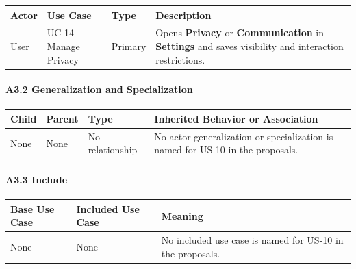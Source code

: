 \documentclass[12pt]{article}
\renewcommand{\baselinestretch}{1.5}
\begin{document}
\begingroup
\small
\renewcommand{\baselinestretch}{1.0}\selectfont
\renewcommand{\arraystretch}{1.15}
\setlength{\tabcolsep}{6pt}
\begin{longtable}{|>{\raggedright\arraybackslash}p{}|>{\raggedright\arraybackslash}p{}|>{\raggedright\arraybackslash}p{}|>{\raggedright\arraybackslash}p{}|}
\hline
\textbf{Actor} & \textbf{Use Case} & \textbf{Type} & \textbf{Description} \\ \hline
\endhead
User & UC-14 Manage Privacy & Primary & Opens \textbf{Privacy} or \textbf{Communication} in \textbf{Settings} and saves visibility and interaction restrictions. \\ \hline
\end{longtable}
\endgroup
\par\medskip

\hypertarget{sec:a3-2-generalization-and-specialization}{}
\paragraph*{A3.2 Generalization and Specialization}
\par\medskip

\begingroup
\small
\renewcommand{\baselinestretch}{1.0}\selectfont
\renewcommand{\arraystretch}{1.15}
\setlength{\tabcolsep}{6pt}
\begin{longtable}{|>{\raggedright\arraybackslash}p{}|>{\raggedright\arraybackslash}p{}|>{\raggedright\arraybackslash}p{}|>{\raggedright\arraybackslash}p{}|}
\hline
\textbf{Child} & \textbf{Parent} & \textbf{Type} & \textbf{Inherited Behavior or Association} \\ \hline
\endhead
None & None & No relationship & No actor generalization or specialization is named for US-10 in the proposals. \\ \hline
\end{longtable}
\endgroup
\par\medskip

\hypertarget{sec:a3-3-include}{}
\paragraph*{A3.3 Include}
\par\medskip

\begingroup
\small
\renewcommand{\baselinestretch}{1.0}\selectfont
\renewcommand{\arraystretch}{1.15}
\setlength{\tabcolsep}{6pt}
\begin{longtable}{|>{\raggedright\arraybackslash}p{}|>{\raggedright\arraybackslash}p{}|>{\raggedright\arraybackslash}p{}|}
\hline
\textbf{Base Use Case} & \textbf{Included Use Case} & \textbf{Meaning} \\ \hline
\endhead
None & None & No included use case is named for US-10 in the proposals. \\ \hline
\end{longtable}
\endgroup
\par\medskip
\end{document}
